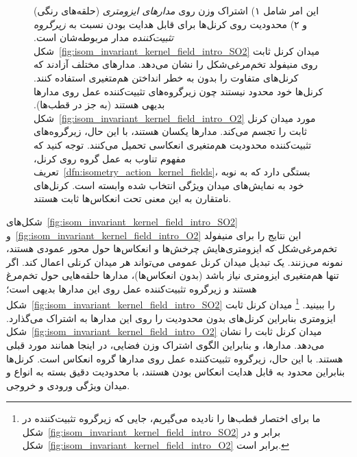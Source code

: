 \begin{figure}
\begin{minipage}[b]{0.48\textwidth}
		این امر شامل
		۱) اشتراک وزن روی \emph{مدارهای ایزومتری} (حلقه‌های رنگی) و
		۲) محدودیت روی کرنل‌ها برای قابل هدایت بودن نسبت به \emph{زیرگروه تثبیت‌کننده} مدار مربوطه‌شان است.
		شکل~\ref{fig:isom_invariant_kernel_field_intro_SO2} میدان کرنل ثابت  روی منیفولد تخم‌مرغی‌شکل را نشان می‌دهد.
		مدارهای مختلف آزادند که کرنل‌های متفاوت را بدون به خطر انداختن هم‌متغیری  استفاده کنند.
		کرنل‌ها خود محدود نیستند چون زیرگروه‌های تثبیت‌کننده عمل  روی مدارها بدیهی هستند (به جز در قطب‌ها).
		شکل~\ref{fig:isom_invariant_kernel_field_intro_O2} مورد میدان کرنل ثابت  را تجسم می‌کند.
		مدارها یکسان هستند، با این حال، زیرگروه‌های تثبیت‌کننده محدودیت هم‌متغیری انعکاسی تحمیل می‌کنند.
		توجه کنید که مفهوم تناوب به عمل گروه روی کرنل، تعریف~\ref{dfn:isometry_action_kernel_fields}، بستگی دارد که به نوبه خود به نمایش‌های میدان ویژگی انتخاب شده وابسته است.
		کرنل‌های نامتقارن به این معنی تحت انعکاس‌ها ثابت هستند.
	\end{minipage}
	\label{fig:isom_invariant_kernel_field_intro}
\end{figure}


شکل‌های~\ref{fig:isom_invariant_kernel_field_intro_SO2} و~\ref{fig:isom_invariant_kernel_field_intro_O2}
این نتایج را برای منیفولد تخم‌مرغی‌شکل که ایزومتری‌هایش چرخش‌ها و انعکاس‌ها حول محور عمودی هستند، نمونه می‌زنند.
یک تبدیل میدان کرنل عمومی می‌تواند هر میدان کرنلی اعمال کند.
اگر تنها هم‌متغیری ایزومتری  نیاز باشد (بدون انعکاس‌ها)، مدارها حلقه‌هایی حول تخم‌مرغ هستند و زیرگروه تثبیت‌کننده عمل  روی این مدارها بدیهی است؛ شکل~\ref{fig:isom_invariant_kernel_field_intro_SO2} را ببینید.%
\footnote{
	ما برای اختصار قطب‌ها را نادیده می‌گیریم، جایی که زیرگروه تثبیت‌کننده در شکل~\ref{fig:isom_invariant_kernel_field_intro_SO2} برابر  و در شکل~\ref{fig:isom_invariant_kernel_field_intro_O2} برابر  است.
}
میدان کرنل ثابت ایزومتری بنابراین کرنل‌های بدون محدودیت را روی این مدارها به اشتراک می‌گذارد.
شکل~\ref{fig:isom_invariant_kernel_field_intro_O2} میدان کرنل ثابت  را نشان می‌دهد.
مدارها، و بنابراین الگوی اشتراک وزن فضایی، در اینجا همانند مورد قبلی هستند.
با این حال، زیرگروه تثبیت‌کننده عمل  روی مدارها گروه انعکاس است.
کرنل‌ها بنابراین محدود به قابل هدایت انعکاس بودن هستند، با محدودیت دقیق بسته به انواع  و  میدان ویژگی ورودی و خروجی.



